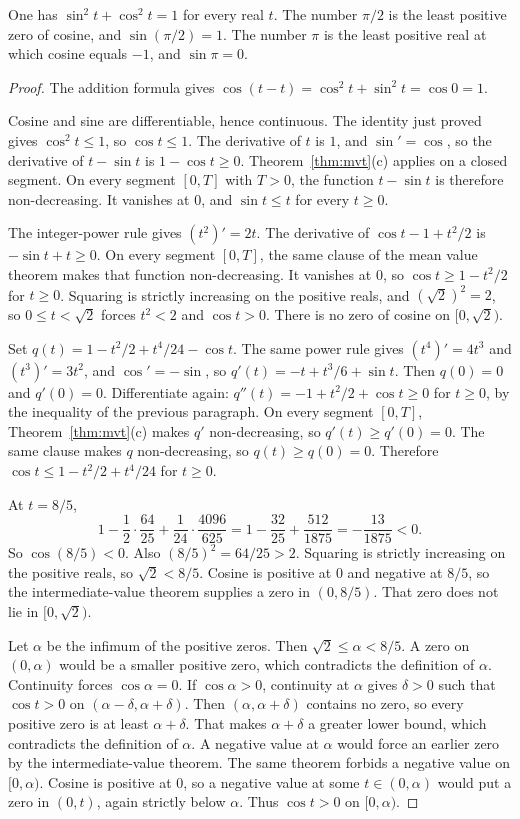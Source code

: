 \begin{propositionx}
One has $\sin^2 t+\cos^2 t=1$ for every real $t$. The number $\pi/2$ is the least positive zero of cosine, and $\sin(\pi/2)=1$. The number $\pi$ is the least positive real at which cosine equals $-1$, and $\sin\pi=0$.
\end{propositionx}
\begin{proof}
The addition formula gives $\cos(t-t)=\cos^2 t+\sin^2 t=\cos 0=1$.

Cosine and sine are differentiable, hence continuous. The identity just proved gives $\cos^2 t\le 1$, so $\cos t\le 1$. The derivative of $t$ is $1$, and $\sin'=\cos$, so the derivative of $t-\sin t$ is $1-\cos t\ge 0$. Theorem~\ref{thm:mvt}(c) applies on a closed segment. On every segment $[0,T]$ with $T>0$, the function $t-\sin t$ is therefore non-decreasing. It vanishes at $0$, and $\sin t\le t$ for every $t\ge 0$.

The integer-power rule gives $(t^2)'=2t$. The derivative of $\cos t-1+t^2/2$ is $-\sin t+t\ge 0$. On every segment $[0,T]$, the same clause of the mean value theorem makes that function non-decreasing. It vanishes at $0$, so $\cos t\ge 1-t^2/2$ for $t\ge 0$. Squaring is strictly increasing on the positive reals, and $(\sqrt2)^2=2$, so $0\le t<\sqrt2$ forces $t^2<2$ and $\cos t>0$. There is no zero of cosine on $[0,\sqrt2)$.

Set $q(t)=1-t^2/2+t^4/24-\cos t$. The same power rule gives $(t^4)'=4t^3$ and $(t^3)'=3t^2$, and $\cos'=-\sin$, so $q'(t)=-t+t^3/6+\sin t$. Then $q(0)=0$ and $q'(0)=0$. Differentiate again: $q''(t)=-1+t^2/2+\cos t\ge 0$ for $t\ge 0$, by the inequality of the previous paragraph. On every segment $[0,T]$, Theorem~\ref{thm:mvt}(c) makes $q'$ non-decreasing, so $q'(t)\ge q'(0)=0$. The same clause makes $q$ non-decreasing, so $q(t)\ge q(0)=0$. Therefore $\cos t\le 1-t^2/2+t^4/24$ for $t\ge 0$.

At $t=8/5$,
\[
1-\frac12\cdot\frac{64}{25}+\frac1{24}\cdot\frac{4096}{625}=1-\frac{32}{25}+\frac{512}{1875}=-\frac{13}{1875}<0.
\]
So $\cos(8/5)<0$. Also $(8/5)^2=64/25>2$. Squaring is strictly increasing on the positive reals, so $\sqrt2<8/5$. Cosine is positive at $0$ and negative at $8/5$, so the intermediate-value theorem supplies a zero in $(0,8/5)$. That zero does not lie in $[0,\sqrt2)$.

Let $\alpha$ be the infimum of the positive zeros. Then $\sqrt2\le\alpha<8/5$. A zero on $(0,\alpha)$ would be a smaller positive zero, which contradicts the definition of $\alpha$. Continuity forces $\cos\alpha=0$. If $\cos\alpha>0$, continuity at $\alpha$ gives $\delta>0$ such that $\cos t>0$ on $(\alpha-\delta,\alpha+\delta)$. Then $(\alpha,\alpha+\delta)$ contains no zero, so every positive zero is at least $\alpha+\delta$. That makes $\alpha+\delta$ a greater lower bound, which contradicts the definition of $\alpha$. A negative value at $\alpha$ would force an earlier zero by the intermediate-value theorem. The same theorem forbids a negative value on $[0,\alpha)$. Cosine is positive at $0$, so a negative value at some $t\in(0,\alpha)$ would put a zero in $(0,t)$, again strictly below $\alpha$. Thus $\cos t>0$ on $[0,\alpha)$.


\end{proof}
